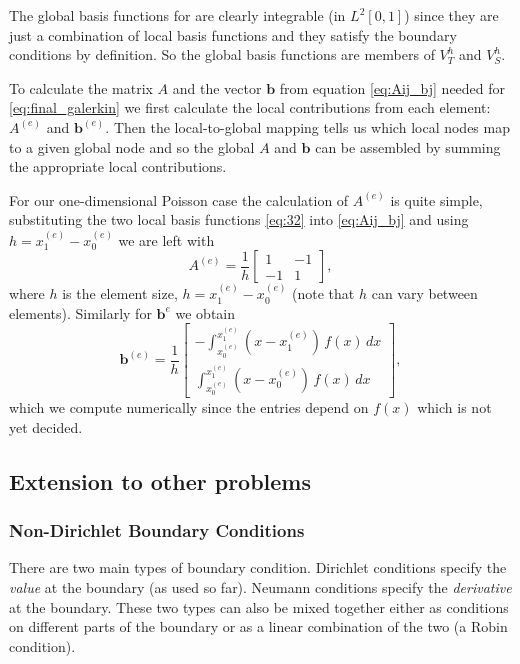 The global basis functions for are clearly integrable (\ie in $L^2[0,1]$) since
they are just a combination of local basis functions and they satisfy the boundary conditions by definition. So the global basis functions are members of $V_T^h$ and $V_S^h$.

To calculate the matrix $A$ and the vector $\mathbf{b}$ from equation
\eqref{eq:Aij_bj} needed for \eqref{eq:final_galerkin} we first calculate the
local contributions from each element: $A^{(e)}$ and $\mathbf{b}^{(e)}$. Then the
local-to-global mapping tells us which local nodes map to a given global node
and so the global $A$ and $\mathbf{b}$ can be assembled by summing the
appropriate local contributions.

For our one-dimensional Poisson case the calculation of $A^{(e)}$ is quite
simple, substituting the two local basis functions \eqref{eq:32} into
\eqref{eq:Aij_bj} and using $h=x_{1}^{(e)}-x_{0}^{(e)}$ we are left with
\begin{equation*}
  A^{(e)} = \dfrac{1}{h}
  \left[
    \begin{array}{cc}
      1 & -1 \\ -1 & 1
    \end{array}
  \right],
\end{equation*}
where $h$ is the element size, $h = x_{1}^{(e)}-x_{0}^{(e)}$ (note that $h$ can
vary between elements). Similarly for $\mathbf{b}^{{e}}$ we obtain
\begin{equation*}
  \mathbf{b}^{(e)}=\dfrac{1}{h}\left[
    \begin{array}{c}
      -\int_{x_{0}^{(e)}}^{x_{1}^{(e)}}(x-x_{1}^{(e)})\, f(x)\, dx\\
      \int_{x_{0}^{(e)}}^{x_{1}^{(e)}}(x-x_{0}^{(e)})\, f(x)\, dx
    \end{array}\right],
\end{equation*}
which we compute numerically since the entries depend on $f(x)$ which is not yet
decided.


\subsection{Extension to other problems}

\subsubsection{Non-Dirichlet Boundary Conditions}
\label{sub:Non-Dirichlet-Boundary-Conditions}

There are two main types of boundary condition. Dirichlet conditions specify the
\emph{value} at the boundary (as used so far). Neumann conditions specify the
\emph{derivative} at the boundary. These two types can also be mixed together
either as conditions on different parts of the boundary or as a linear
combination of the two (a Robin condition).

